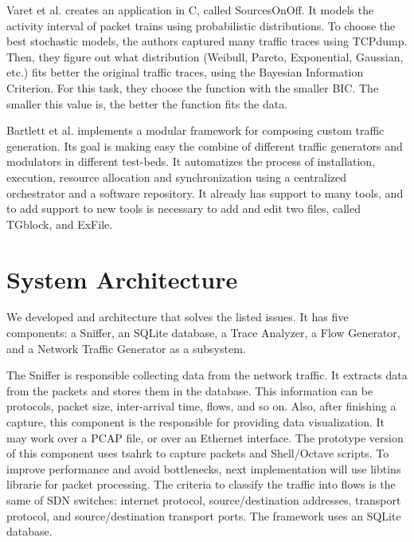 
Varet et al. \cite{sourcesOnOff-paper} creates an application in C, called SourcesOnOff. It models the activity interval of packet trains using probabilistic distributions. To choose the best stochastic models, the authors captured many traffic traces using TCPdump. Then, they figure out what distribution (Weibull, Pareto, Exponential, Gaussian, etc.) fits better the original traffic traces, using the Bayesian Information Criterion. For this task, they choose the function with the smaller BIC. The smaller this value is, the better the function fits the data. 

Bartlett et al. \cite{legotg-paper} implements a modular framework for composing custom traffic generation. Its goal is making easy the combine of different traffic generators and modulators in different test-beds. It automatizes the process of installation, execution, resource allocation and synchronization using a centralized orchestrator and a software repository. It already has support to many tools, and to add support to new tools is necessary to add and edit two files, called TGblock, and ExFile.


\section{System Architecture}
\label{sec:system-architecture-and-requirements}

We developed and architecture that solves the listed issues. It has five components: a Sniffer, an SQLite database, a Trace Analyzer, a Flow Generator, and a Network Traffic Generator as a subsystem.


The Sniffer is responsible collecting data from the network traffic. It extracts data from the packets and stores them in the database. This information can be protocols, packet size, inter-arrival time, flows, and so on. Also, after finishing a capture, this component is the responsible for providing data visualization. It may  work over a PCAP file, or over an Ethernet interface. The prototype version of this component uses tsahrk to capture packets and Shell/Octave scripts. To improve performance and avoid bottlenecks, next implementation will use libtins librarie for packet processing. The criteria to classify the traffic into flows is the same of SDN switches: internet protocol, source/destination addresses, transport protocol, and source/destination transport ports. The framework uses an SQLite database.

